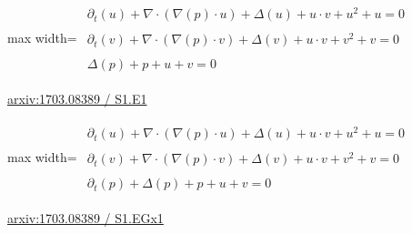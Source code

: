 \documentclass[10pt,a4paper]{article}
\begin{document}
\begin{minipage}{\linewidth}
\begin{center}\begin{adjustbox}{max width=\linewidth}$\displaystyle\begin{gathered}\begin{gathered}\partial_{t}(u)+\nabla\cdot(\nabla(p)\cdot u)+\Delta(u)+u\cdot v+u^{2}+u=0\end{gathered}\\[5pt]\begin{gathered}\partial_{t}(v)+\nabla\cdot(\nabla(p)\cdot v)+\Delta(v)+u\cdot v+v^{2}+v=0\end{gathered}\\[5pt]\begin{gathered}\Delta(p)+p+u+v=0\end{gathered}\end{gathered}$\end{adjustbox}\end{center}
{\small \href{https://arxiv.org/html/1703.08389#S1.E1}{arxiv:1703.08389 / S1.E1}}\par
\end{minipage}\par\vspace{7mm}

\begin{minipage}{\linewidth}
\begin{center}\begin{adjustbox}{max width=\linewidth}$\displaystyle\begin{gathered}\begin{gathered}\partial_{t}(u)+\nabla\cdot(\nabla(p)\cdot u)+\Delta(u)+u\cdot v+u^{2}+u=0\end{gathered}\\[5pt]\begin{gathered}\partial_{t}(v)+\nabla\cdot(\nabla(p)\cdot v)+\Delta(v)+u\cdot v+v^{2}+v=0\end{gathered}\\[5pt]\begin{gathered}\partial_{t}(p)+\Delta(p)+p+u+v=0\end{gathered}\end{gathered}$\end{adjustbox}\end{center}
{\small \href{https://arxiv.org/html/1703.08389#S1.EGx1}{arxiv:1703.08389 / S1.EGx1}}\par
\end{minipage}\par\vspace{7mm}
\end{document}
